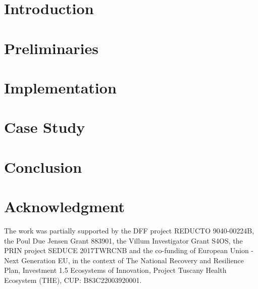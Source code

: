 \documentclass[a4paper,american]{llncs}
\begin{document}
\maketitle

\begin{abstract}
	
\end{abstract}



\section{Introduction}\label{sec_intro}




\section{Preliminaries}\label{sec_pre}




\section{Implementation}\label{sec_imp}





\section{Case Study}\label{sec_eval}





\section{Conclusion}\label{sec_conc}




\section*{Acknowledgment}
The work was partially supported by the DFF project REDUCTO 9040-00224B, the Poul Due Jensen Grant 883901, the Villum Investigator Grant S4OS, the PRIN project SEDUCE 2017TWRCNB and the co-funding of European Union - Next Generation EU, in the context of The National Recovery and Resilience Plan, Investment 1.5 Ecosystems of Innovation, Project Tuscany Health Ecosystem (THE), CUP: B83C22003920001.







\appendix
%

\end{document}
